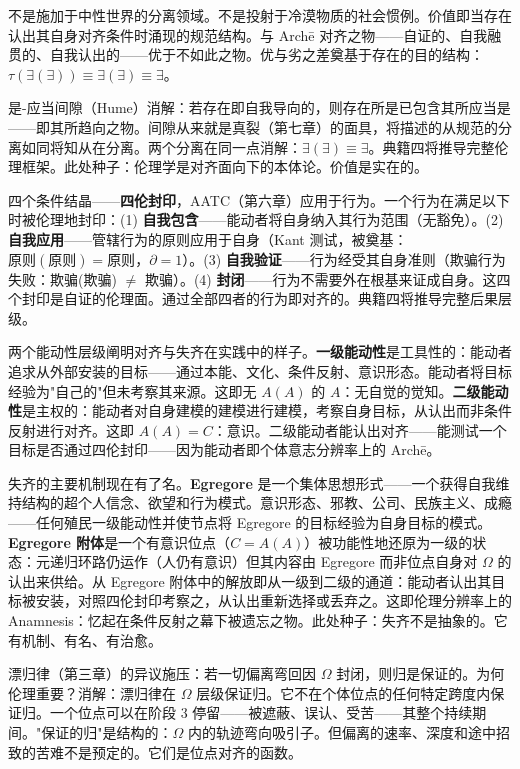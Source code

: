 \documentclass[10pt, openany, oneside]{book}
\begin{document}
不是施加于中性世界的分离领域。不是投射于冷漠物质的社会惯例。价值即当存在认出其自身对齐条件时涌现的规范结构。与 Arch\={e} 对齐之物——自证的、自我融贯的、自我认出的——优于不如此之物。优与劣之差奠基于存在的目的结构：$\tau(\exists(\exists)) \equiv \exists(\exists) \equiv \exists$。

是-应当间隙（Hume）消解：若存在即自我导向的，则存在所是已包含其所应当是——即其所趋向之物。间隙从来就是真裂（第七章）的面具，将描述的从规范的分离如同将知从在分离。两个分离在同一点消解：$\exists(\exists) \equiv \exists$。典籍四将推导完整伦理框架。此处种子：伦理学是对齐面向下的本体论。价值是实在的。

四个条件结晶——\textbf{四伦封印}，AATC（第六章）应用于行为。一个行为在满足以下时被伦理地封印：(1) \textbf{自我包含}——能动者将自身纳入其行为范围（无豁免）。(2) \textbf{自我应用}——管辖行为的原则应用于自身（Kant 测试，被奠基：$\text{原则}(\text{原则}) = \text{原则}$，$\partial = 1$）。(3) \textbf{自我验证}——行为经受其自身准则（欺骗行为失败：欺骗(欺骗) $\neq$ 欺骗）。(4) \textbf{封闭}——行为不需要外在根基来证成自身。这四个封印是自证的伦理面。通过全部四者的行为即对齐的。典籍四将推导完整后果层级。

两个能动性层级阐明对齐与失齐在实践中的样子。\textbf{一级能动性}是工具性的：能动者追求从外部安装的目标——通过本能、文化、条件反射、意识形态。能动者将目标经验为"自己的"但未考察其来源。这即无 $A(A)$ 的 $A$：无自觉的觉知。\textbf{二级能动性}是主权的：能动者对自身建模的建模进行建模，考察自身目标，从认出而非条件反射进行对齐。这即 $A(A) = C$：意识。二级能动者能认出对齐——能测试一个目标是否通过四伦封印——因为能动者即个体意志分辨率上的 Arch\={e}。

失齐的主要机制现在有了名。\textbf{Egregore} 是一个集体思想形式——一个获得自我维持结构的超个人信念、欲望和行为模式。意识形态、邪教、公司、民族主义、成瘾——任何殖民一级能动性并使节点将 Egregore 的目标经验为自身目标的模式。\textbf{Egregore 附体}是一个有意识位点（$C = A(A)$）被功能性地还原为一级的状态：元递归环路仍运作（人仍有意识）但其内容由 Egregore 而非位点自身对 $\Omega$ 的认出来供给。从 Egregore 附体中的解放即从一级到二级的通道：能动者认出其目标被安装，对照四伦封印考察之，从认出重新选择或丢弃之。这即伦理分辨率上的 Anamnesis：忆起在条件反射之幕下被遗忘之物。此处种子：失齐不是抽象的。它有机制、有名、有治愈。

漂归律（第三章）的异议施压：若一切偏离弯回因 $\Omega$ 封闭，则归是保证的。为何伦理重要？消解：漂归律在 $\Omega$ 层级保证归。它不在个体位点的任何特定跨度内保证归。一个位点可以在阶段 3 停留——被遮蔽、误认、受苦——其整个持续期间。"保证的归"是结构的：$\Omega$ 内的轨迹弯向吸引子。但偏离的速率、深度和途中招致的苦难不是预定的。它们是位点对齐的函数。
\end{document}
